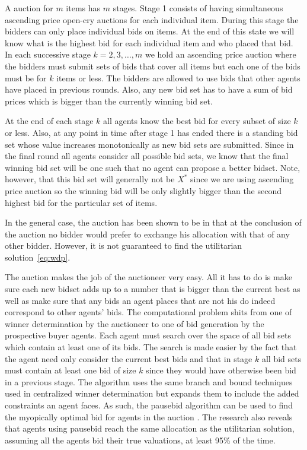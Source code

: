A  auction for $m$ items has $m$ stages. Stage 1 consists
of having simultaneous ascending price open-cry auctions for each
individual item. During this stage the bidders can only place
individual bids on items. At the end of this state we will know what
is the highest bid for each individual item and who placed that bid.
In each successive stage $k=2,3,\ldots,m$ we hold an ascending price
auction where the bidders must submit sets of bids that cover all
items but each one of the bids must be for $k$ items or less.  The
bidders are allowed to use bids that other agents have placed in
previous rounds. Also, any new bid set has to have a sum of bid prices
which is bigger than the currently winning bid set.

At the end of each stage $k$ all agents know the best bid for every
subset of size $k$ or less. Also, at any point in time after stage 1
has ended there is a standing bid set whose value increases
monotonically as new bid sets are submitted. Since in the final round
all agents consider all possible bid sets, we know that the final
winning bid set will be one such that no agent can propose a better
bidset. Note, however, that this bid set will generally not be $X^*$
since we are using ascending price auction so the winning bid will be
only slightly bigger than the second highest bid for the particular
set of items.

In the general case, the  auction has been shown to be
 in that at the conclusion of the auction no bidder
would prefer to exchange his allocation with that of any other bidder.
However, it is not guaranteed to find the utilitarian
solution~\eqref{eq:wdp}.


The  auction makes the job of the auctioneer very easy.
All it has to do is make sure each new bidset adds up to a number that
is bigger than the current best as well as make sure that any bids an
agent places that are not his do indeed correspond to other agents'
bids. The computational problem shits from one of winner determination
by the auctioneer to one of bid generation by the prospective buyer
agents. Each agent must search over the space of all bid sets which
contain at least one of its bids.  The search is made easier by the
fact that the agent need only consider the current best bids and that
in stage $k$ all bid sets must contain at least one bid of size $k$
since they would have otherwise been bid in a previous stage. The
 algorithm uses the same branch and bound techniques used
in centralized winner determination but expands them to include the
added constraints an agent faces. As such, the pausebid algorithm can
be used to find the myopically optimal bid for agents in the
 auction \cite{mendoza07a}. The research also reveals that
agents using pausebid reach the same allocation as the utilitarian
solution, assuming all the agents bid their true valuations, at least
95\% of the time.

